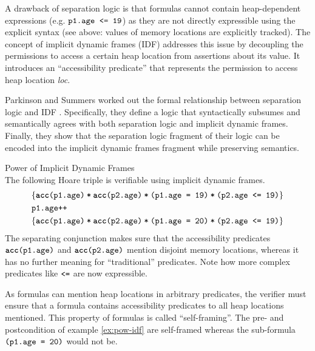 A drawback of separation logic is that formulas cannot contain heap-dependent expressions (e.g. $\textup{\texttt{p1.age <= 19}}$) as they are not directly expressible using the explicit syntax (see above: values of memory locations are explicitly tracked).
The concept of implicit dynamic frames (IDF) \cite{smans2009implicit} addresses this issue by decoupling the permissions to access a certain heap location from assertions about its value.
It introduces an “accessibility predicate”  that represents the permission to access heap location \textit{loc}.

Parkinson and Summers worked out the formal relationship between separation logic and IDF \cite{parkinson2011relationship}.
Specifically, they define a logic that syntactically subsumes and semantically agrees with both separation logic and implicit dynamic frames.
Finally, they show that the separation logic fragment of their logic can be encoded into the implicit dynamic frames fragment while preserving semantics.

\begin{example}{Power of Implicit Dynamic Frames}~\\
    \label{ex:pow-idf}
    The following Hoare triple is verifiable using implicit dynamic frames.
    \begin{alignat*}{1}
    &\{\textup{\texttt{\textup{\texttt{\textup{\texttt{\textbf{acc}(p1.age)}}\:*\:\textup{\texttt{\textbf{acc}(p2.age)}}}}\:*\:\textup{\texttt{\textup{\texttt{(p1.age = 19)}}\:*\:\textup{\texttt{(p2.age <= 19)}}}}}}\}\\
    &{\textup{\texttt{p1.age++}}}\\
    &\{\textup{\texttt{\textup{\texttt{\textup{\texttt{\textbf{acc}(p1.age)}}\:*\:\textup{\texttt{\textbf{acc}(p2.age)}}}}\:*\:\textup{\texttt{\textup{\texttt{(p1.age = 20)}}\:*\:\textup{\texttt{(p2.age <= 19)}}}}}}\}
    \end{alignat*}
    The separating conjunction makes sure that the accessibility predicates $\textup{\texttt{\textbf{acc}(p1.age)}}$ and $\textup{\texttt{\textbf{acc}(p2.age)}}$ mention disjoint memory locations, whereas it has no further meaning for “traditional” predicates.
    Note how more complex predicates like $\textup{\texttt{<=}}$ are now expressible.
\end{example}

As formulas can mention heap locations in arbitrary predicates, the verifier must ensure that a formula contains accessibility predicates to all heap locations mentioned.
This property of formulas is called “self-framing”.
The pre- and postcondition of example \ref{ex:pow-idf} are self-framed whereas the sub-formula $\textup{\texttt{(p1.age = 20)}}$ would not be.

